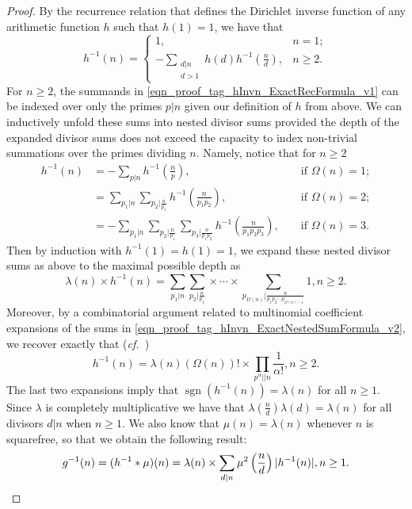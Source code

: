 \documentclass[11pt,reqno,a4letter]{article}
\numberwithin{figure}{section}
\numberwithin{table}{section}
\newcommand{\cf}{\textit{cf.\ }}
\theoremstyle{plain}
\numberwithin{theorem}{section}
\theoremstyle{definition}
\begin{document}
\begin{proof}
By the recurrence relation that defines the Dirichlet inverse function of any 
arithmetic function $h$ such that $h(1) = 1$, we have that \cite[\S 2.7]{APOSTOLANUMT} 
\begin{equation} 
\label{eqn_proof_tag_hInvn_ExactRecFormula_v1}
h^{-1}(n) = \begin{cases} 
            1, & n = 1; \\ 
            -\sum\limits_{\substack{d|n \\ d>1}} h(d) h^{-1}\left(\frac{n}{d}\right), & n \geq 2. 
            \end{cases} 
\end{equation} 
For $n \geq 2$, the summands in \eqref{eqn_proof_tag_hInvn_ExactRecFormula_v1} 
can be indexed over only the primes $p|n$ given our definition of $h$ from above. 
We can inductively 
unfold these sums into nested divisor sums provided the depth of the 
expanded divisor sums does not exceed the 
capacity to index non-trivial summations over the primes dividing $n$. 
Namely, notice that for $n \geq 2$ 
\begin{align*} 
h^{-1}(n) & = -\sum_{p|n} h^{-1}\left(\frac{n}{p}\right), && \text{\ if\ } \Omega(n) = 1; \\ 
     & = \sum_{p_1|n} \sum_{p_2|\frac{n}{p_1}} h^{-1}\left(\frac{n}{p_1p_2}\right), && \text{\ if\ } \Omega(n) = 2; \\ 
     & = -\sum_{p_1|n} \sum_{p_2|\frac{n}{p_1}} \sum_{p_3|\frac{n}{p_1p_2}} h^{-1}\left(\frac{n}{p_1p_2p_3}\right), 
     && \text{\ if\ } \Omega(n) = 3. 
\end{align*} 
Then by induction with $h^{-1}(1) = h(1) = 1$, we expand these 
nested divisor sums as above to the maximal possible depth as 
\begin{equation} 
\label{eqn_proof_tag_hInvn_ExactNestedSumFormula_v2} 
\lambda(n) \times h^{-1}(n) = \sum_{p_1|n} \sum_{p_2|\frac{n}{p_1}} \times \cdots \times 
     \sum_{p_{\Omega(n)}|\frac{n}{p_1p_2 \cdots p_{\Omega(n)-1}}} 1, n \geq 2. 
\end{equation} 
Moreover, by a combinatorial argument related to multinomial coefficient expansions of the sums in 
\eqref{eqn_proof_tag_hInvn_ExactNestedSumFormula_v2}, we recover exactly that 
(\cf \cite[\S 2]{FROBERG-1968}) 
\begin{equation} 
\label{eqn_proof_tag_hInvn_ExactNestedSumFormula_CombInterpetIdent_v3} 
h^{-1}(n) = \lambda(n) (\Omega(n))! \times \prod_{p^{\alpha} || n} \frac{1}{\alpha!}, n \geq 2. 
\end{equation} 
The last two expansions imply that  
$\operatorname{sgn}(h^{-1}(n)) = \lambda(n)$ for all $n \geq 1$. 
Since $\lambda$ is completely multiplicative we have that 
$\lambda\left(\frac{n}{d}\right) \lambda(d) = \lambda(n)$ for all divisors 
$d|n$ when $n \geq 1$. We also know that $\mu(n) = \lambda(n)$ whenever $n$ is squarefree, 
so that we obtain the following result: 
\[
g^{-1}(n) = (h^{-1} \ast \mu)(n) = \lambda(n) \times \sum_{d|n} \mu^2\left(\frac{n}{d}\right) |h^{-1}(n)|, n \geq 1. 
     \qedhere 
\]
\end{proof} 
\end{document}
